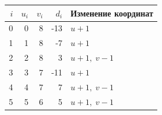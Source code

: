 \begin{tabular}{rrrrl}\toprule
$i$ & $u_i$ & $v_i$ & $d_i$ & Изменение координат\\\midrule
0 & 0 & 8 & -13 & $u+1$\\
1 & 1 & 8 & -7 & $u+1$\\
2 & 2 & 8 & 3 & $u+1,\;v-1$\\
3 & 3 & 7 & -11 & $u+1$\\
4 & 4 & 7 & 7 & $u+1,\;v-1$\\
5 & 5 & 6 & 5 & $u+1,\;v-1$\\
\bottomrule\end{tabular}
